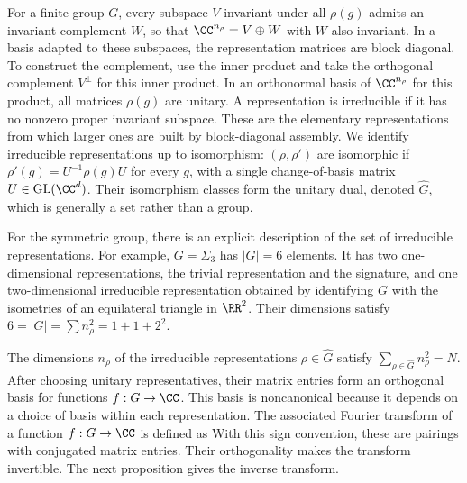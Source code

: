 For a finite group $G$, every subspace $V$ invariant under all $\rho(g)$ admits an invariant complement $W$, so that $\CC^{n_\rho}=V\oplus W$ with $W$ also invariant. In a basis adapted to these subspaces, the representation matrices are block diagonal. To construct the complement, use the inner product
and take the orthogonal complement $V^\bot$ for this inner product. In an orthonormal basis of $\CC^{n_\rho}$ for this product, all matrices $\rho(g)$ are unitary.
%
A representation is irreducible if it has no nonzero proper invariant subspace. These are the elementary representations from which larger ones are built by block-diagonal assembly.
%
We identify irreducible representations up to isomorphism: $(\rho,\rho')$ are isomorphic if $\rho'(g)=U^{-1}\rho(g)U$ for every $g$, with a single change-of-basis matrix $U \in \text{GL}(\CC^d)$. Their isomorphism classes form the unitary dual, denoted $\hat G$, which is generally a set rather than a group.

For the symmetric group, there is an explicit description of the set of irreducible representations.  
%
For example, $G=\Sigma_3$ has $|G|=6$ elements. It has two one-dimensional representations, the trivial representation and the signature, and one two-dimensional irreducible representation obtained by identifying $G$ with the isometries of an equilateral triangle in $\RR^2$. Their dimensions satisfy $6 = |G| = \sum n_\rho^2 = 1+1+2^2$.

The dimensions $n_\rho$ of the irreducible representations $\rho\in\hat G$ satisfy $\sum_{\rho \in \hat G} n_\rho^2 = N$. After choosing unitary representatives, their matrix entries form an orthogonal basis for functions $f : G \rightarrow \CC$. This basis is noncanonical because it depends on a choice of basis within each representation.
%
The associated Fourier transform of a function $f:G\rightarrow\CC$ is defined as
With this sign convention, these are pairings with conjugated matrix entries. Their orthogonality makes the transform invertible.
%
The next proposition gives the inverse transform.

